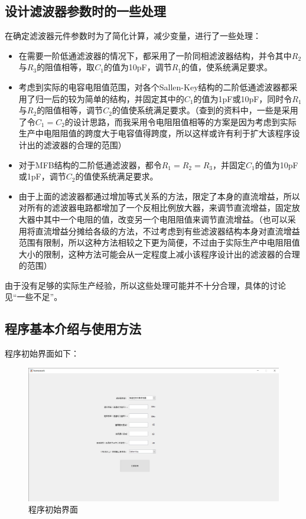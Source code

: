 \documentclass[UTF8]{ctexart}
\begin{document}
\subsection{设计滤波器参数时的一些处理}
在确定滤波器元件参数时为了简化计算，减少变量，进行了一些处理：
\begin{itemize}
\item 在需要一阶低通滤波器的情况下，都采用了一阶同相滤波器结构，并令其中$R_2$与$R_3$的阻值相等，取$C_1$的值为10pF，调节$R_1$的值，使系统满足要求。
\item 考虑到实际的电容电阻值范围，对各个Sallen-Key结构的二阶低通滤波器都采用了归一后的较为简单的结构，并固定其中的$C_1$的值为1pF或10pF，同时令$R_1$与$R_2$的阻值相等，调节$C_2$的值使系统满足要求。（查到的资料中，一些是采用了令$C_1=C_2$的设计思路，而我采用令电阻阻值相等的方案是因为考虑到实际生产中电阻阻值的跨度大于电容值得跨度，所以这样或许有利于扩大该程序设计出的滤波器的合理的范围）
\item 对于MFB结构的二阶低通滤波器，都令$R_1=R_2=R_3$，并固定$C_1$的值为10pF或1pF，调节$C_2$的值使系统满足要求。
\item 由于上面的滤波器都通过增加等式关系的方法，限定了本身的直流增益，所以对所有的滤波器电路都增加了一个反相比例放大器，来调节直流增益，固定放大器中其中一个电阻的值，改变另一个电阻阻值来调节直流增益。（也可以采用将直流增益分摊给各级的方法，不过考虑到有些滤波器结构本身对直流增益范围有限制，所以这种方法相较之下更为简便，不过由于实际生产中电阻阻值大小的限制，这种方法可能会从一定程度上减小该程序设计出的滤波器的合理的范围）
\end{itemize}

由于没有足够的实际生产经验，所以这些处理可能并不十分合理，具体的讨论见“一些不足”。
\subsection{程序基本介绍与使用方法}
程序初始界面如下：
\begin{figure}[H]
\centering
\includegraphics[width=\textwidth]{7.png}
\caption{程序初始界面}
\end{figure}
\end{document}
